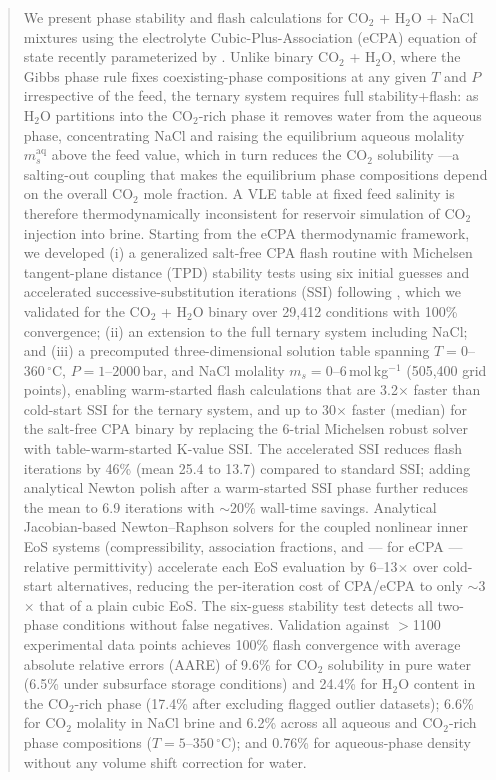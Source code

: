 \documentclass[preprint,12pt,authoryear]{elsarticle}
\begin{document}
\begin{frontmatter}
\begin{abstract}
We present phase stability and flash calculations for
CO$_2$ + H$_2$O + NaCl mixtures using the electrolyte Cubic-Plus-Association (eCPA) equation
of state recently parameterized by \citet{Coelho2025}.
Unlike binary CO$_2$ + H$_2$O, where the Gibbs phase rule fixes coexisting-phase compositions
at any given $T$ and $P$ irrespective of the feed, the ternary system requires full
stability+flash: as H$_2$O partitions into the CO$_2$-rich phase it removes water from the
aqueous phase, concentrating NaCl and raising the equilibrium aqueous molality
$m_s^\mathrm{aq}$ above the feed value, which in turn reduces the CO$_2$ solubility ---a salting-out coupling that makes the equilibrium
phase compositions depend on the overall CO$_2$ mole fraction.
A VLE table at fixed feed salinity is therefore thermodynamically inconsistent for reservoir
simulation of CO$_2$ injection into brine.
Starting from the eCPA thermodynamic framework, we developed (i) a generalized salt-free CPA flash
routine with Michelsen tangent-plane distance (TPD) stability tests using six initial guesses and
accelerated successive-substitution iterations (SSI) following \citet{Jex2024}, which we validated
for the CO$_2$ + H$_2$O binary over 29{,}412 conditions with 100\% convergence; (ii) an extension
to the full ternary system including NaCl; and (iii) a precomputed three-dimensional solution table
spanning $T = 0$--$360\,^\circ$C, $P = 1$--$2000$\,bar, and NaCl molality $m_s = 0$--$6$\,mol\,kg$^{-1}$
(505{,}400 grid points), enabling warm-started flash calculations that
are 3.2$\times$ faster than cold-start SSI for the ternary system, and up to
30$\times$ faster (median) for the salt-free CPA binary by replacing the
6-trial Michelsen robust solver with table-warm-started K-value SSI.
The accelerated SSI reduces flash iterations by 46\% (mean 25.4 to 13.7) compared to standard SSI;
adding analytical Newton polish after a warm-started SSI phase further reduces the mean to 6.9
iterations with $\sim$20\% wall-time savings.
Analytical Jacobian-based Newton--Raphson solvers for the coupled nonlinear inner EoS systems
(compressibility, association fractions, and — for eCPA — relative permittivity) accelerate
each EoS evaluation by 6--13$\times$ over cold-start alternatives, reducing the per-iteration
cost of CPA/eCPA to only $\sim$3$\times$ that of a plain cubic EoS.
The six-guess stability test detects all two-phase conditions without false negatives.
Validation against $>$1100 experimental data points achieves 100\% flash convergence
with average absolute relative errors (AARE) of
9.6\% for CO$_2$ solubility in pure water (6.5\% under subsurface storage conditions)
and 24.4\% for H$_2$O content in the CO$_2$-rich phase (17.4\% after excluding
flagged outlier datasets);
6.6\% for CO$_2$ molality in NaCl brine and 6.2\% across all aqueous and
CO$_2$-rich phase compositions ($T = 5$--$350\,^\circ$C);
and 0.76\% for aqueous-phase density without any volume shift correction for water.
\end{abstract}


\end{frontmatter}
\end{document}

